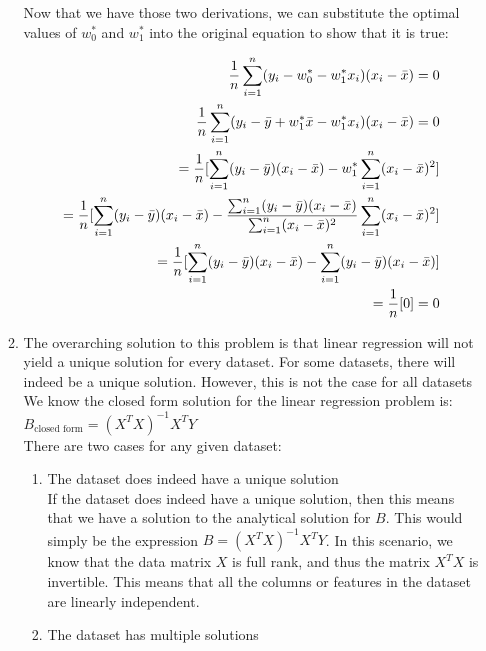 \documentclass[12pt]{article}
\begin{document}
\begin{enumerate}
\begin{enumerate}
 Now that we have those two derivations, we can substitute the optimal values of $w_0^*$ and $w_1^*$ into the original equation to show that it is true:

 \begin{align}
  \frac{1}{n} \sum_{i=1}^{n} (y_i - w^*_0 - w_{1}^{*}x_i)(x_i-\bar{x}) = 0 \notag \\ 
  \frac{1}{n} \sum_{i=1}^{n} (y_i - \bar{y} + w_1^* \bar{x} - w_1^*x_i) (x_i - \bar{x}) = 0 \notag \\ 
  = \frac{1}{n} [\sum_{i=1}^{n}(y_i-\bar{y})(x_i-\bar{x}) - w_1^* \sum_{i=1}^{n}(x_i-\bar{x})^2] \notag \\ 
  = \frac{1}{n}[\sum_{i=1}^{n}(y_i-\bar{y})(x_i-\bar{x}) - \frac{\sum_{i=1}^{n} (y_i - \bar{y})(x_i - \bar{x})}{\sum_{i=1}^{n} (x_i-\bar{x})^2} \sum_{i=1}^{n}(x_i-\bar{x})^2] \notag \\ 
  = \frac{1}{n}[\sum_{i=1}^{n}(y_i-\bar{y})(x_i-\bar{x}) - \sum_{i=1}^{n} (y_i - \bar{y})(x_i - \bar{x})] \notag \\  
  = \frac{1}{n} [0] = 0 \notag
 \end{align}
 
 \item The overarching solution to this problem is that linear regression will not yield a unique solution for every dataset. For some datasets, there will indeed be a unique solution. However, this is not the case for all datasets \\ 

 We know the closed form solution for the linear regression problem is: $B_{\text{closed form}} = (X^TX)^{-1}X^TY$ \\

 There are two cases for any given dataset:


 \begin{enumerate}
  \item The dataset does indeed have a unique solution \\

    If the dataset does indeed have a unique solution, then this means that we have a solution to the analytical solution for $B$. This would simply be 
    the expression $B = (X^TX)^{-1}X^TY$. In this scenario, we know that the data matrix $X$ is full rank, and thus the matrix $X^TX$ is invertible. This means that all the columns or features in the dataset are linearly independent. 
  

  \item The dataset has multiple solutions \\
  

\end{enumerate}
\end{enumerate}
\end{enumerate}
\end{document}
